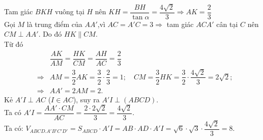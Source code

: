 \begin{ex}
{{}
Tam giác $BKH$ vuông tại $H$ nên $KH=\dfrac{BH}{\tan\alpha}=\dfrac{4\sqrt{2}}{3} \Rightarrow AK=\dfrac{2}{3}$\\ 
Gọi $M$ là trung điểm của $AA'$,vì $AC=A'C=3\Rightarrow $ tam giác $ACA'$ cân tại $C$ nên  $CM \perp AA'$. Do đó $HK\parallel CM$.\\
Từ đó 
\begin{eqnarray*}
&&\dfrac{AK}{AM}=\dfrac{HK}{CM}=\dfrac{AH}{AC}=\dfrac{2}{3}\\
&\Rightarrow & AM=\dfrac{3}{2}AK=\dfrac{3}{2}\cdot \dfrac{2}{3}=1; \quad CM=\dfrac{3}{2}HK =\dfrac{3}{2}\cdot \dfrac{4\sqrt{2}}{3} = 2\sqrt{2};\\
&\Rightarrow & AA'=2AM =2.
\end{eqnarray*}
Kẻ $A'I \perp AC $ ($I\in AC$), suy ra $A'I\perp (ABCD)$.\\
Ta có $A'I=\dfrac{AA'\cdot CM}{AC}=\dfrac{2\cdot 2\sqrt{2}}{3}=\dfrac{4\sqrt{2}}{3}$.\\
Ta có: $V_{ABCD.A'B'C'D'}=S_{ABCD}\cdot A'I = AB\cdot AD \cdot A'I= \sqrt{6}\cdot \sqrt{3}\cdot \dfrac{4\sqrt{2}}{3} =8$.}
\end{ex}


